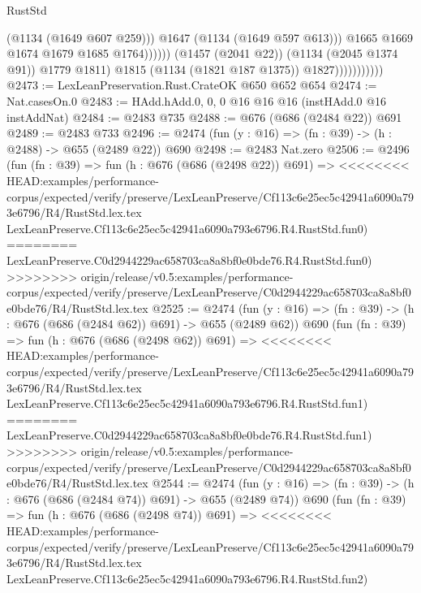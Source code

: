 \begin{lexlean}{RustStd}
\begin{coremodule}
{\begin{coremodule}
{{{{{{{                                            (@1134 (@1649 @607 @259)))
                                          @1647
                                          (@1134 (@1649 @597 @613)))
                                        @1665
                                        @1669
                                        @1674
                                        @1679
                                        @1685
                                        @1764))))))
                            (@1457 (@2041 @22))
                            (@1134 (@2045 @1374 @91))
                            @1779
                            @1811)
                          @1815
                          (@1134 (@1821 @187 @1375))
                          @1827)))))))))))
@2473 := LexLeanPreservation.Rust.CrateOK @650 @652 @654
@2474 := Nat.casesOn.{0}
@2483 := HAdd.hAdd.{0, 0, 0} @16 @16 @16 (instHAdd.{0} @16 instAddNat)
@2484 := @2483 @735
@2488 := @676 (@686 (@2484 @22)) @691
@2489 := @2483 @733
@2496 := @2474 (fun (y : @16) => (fn : @39) -> (h : @2488) -> @655 (@2489 @22)) @690
@2498 := @2483 Nat.zero
@2506 := @2496
    (fun (fn : @39) =>
    fun (h : @676 (@686 (@2498 @22)) @691) =>
<<<<<<<< HEAD:examples/performance-corpus/expected/verify/preserve/LexLeanPreserve/Cf113c6e25ec5c42941a6090a793e6796/R4/RustStd.lex.tex
    LexLeanPreserve.Cf113c6e25ec5c42941a6090a793e6796.R4.RustStd.fun0)
========
    LexLeanPreserve.C0d2944229ac658703ca8a8bf0e0bde76.R4.RustStd.fun0)
>>>>>>>> origin/release/v0.5:examples/performance-corpus/expected/verify/preserve/LexLeanPreserve/C0d2944229ac658703ca8a8bf0e0bde76/R4/RustStd.lex.tex
@2525 := @2474
    (fun (y : @16) => (fn : @39) -> (h : @676 (@686 (@2484 @62)) @691) -> @655 (@2489 @62))
    @690
    (fun (fn : @39) =>
    fun (h : @676 (@686 (@2498 @62)) @691) =>
<<<<<<<< HEAD:examples/performance-corpus/expected/verify/preserve/LexLeanPreserve/Cf113c6e25ec5c42941a6090a793e6796/R4/RustStd.lex.tex
    LexLeanPreserve.Cf113c6e25ec5c42941a6090a793e6796.R4.RustStd.fun1)
========
    LexLeanPreserve.C0d2944229ac658703ca8a8bf0e0bde76.R4.RustStd.fun1)
>>>>>>>> origin/release/v0.5:examples/performance-corpus/expected/verify/preserve/LexLeanPreserve/C0d2944229ac658703ca8a8bf0e0bde76/R4/RustStd.lex.tex
@2544 := @2474
    (fun (y : @16) => (fn : @39) -> (h : @676 (@686 (@2484 @74)) @691) -> @655 (@2489 @74))
    @690
    (fun (fn : @39) =>
    fun (h : @676 (@686 (@2498 @74)) @691) =>
<<<<<<<< HEAD:examples/performance-corpus/expected/verify/preserve/LexLeanPreserve/Cf113c6e25ec5c42941a6090a793e6796/R4/RustStd.lex.tex
    LexLeanPreserve.Cf113c6e25ec5c42941a6090a793e6796.R4.RustStd.fun2)
}}}}}}}
\end{coremodule}}
\end{coremodule}
\end{lexlean}
